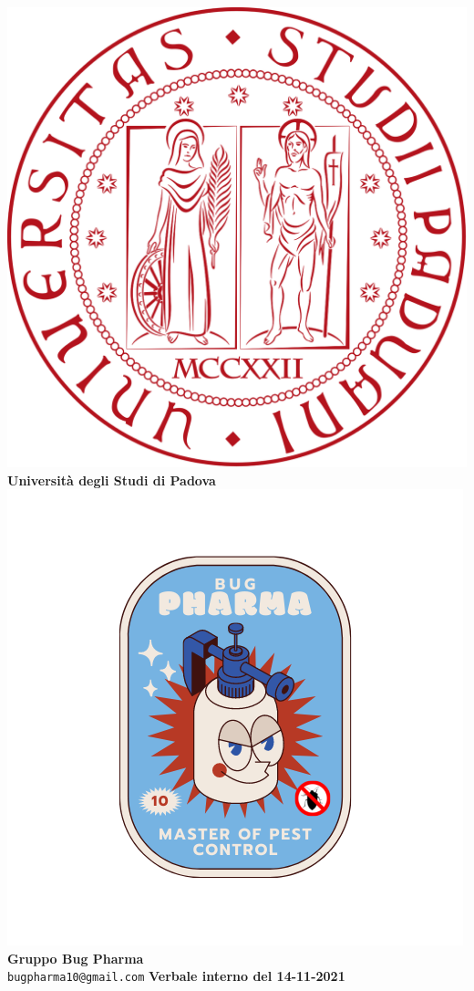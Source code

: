 \documentclass[11pt]{article}
\begin{document}
	\thispagestyle{empty}
	\begin{titlepage}
		\begin{center}
			\includegraphics[scale = 0.05]{../../Res/logo_unipd.png}\\
			\bigskip
			\large \textbf{Università degli Studi di Padova} \\
			\vfill
			\includegraphics[scale = 0.7]{../../Res/BugPharma_Logo.png}\\
			\huge \textbf{Gruppo Bug Pharma} \\
			\vfill
			\large \texttt{bugpharma10@gmail.com}
			\vfill
			\Huge \textbf{Verbale interno del 14-11-2021}\\
			

\end{center}
\end{titlepage}
\end{document}
